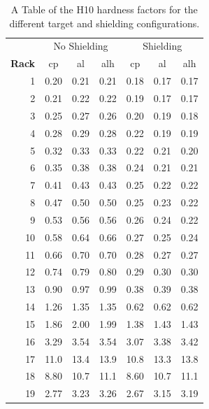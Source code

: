 \documentclass[main.tex]{subfiles}
\begin{document}
\begin{table}[htbp]
  \centering
    \begin{tabular}{r|c|c|c|c|c|c}
     & \multicolumn{3}{c|}{No Shielding} & \multicolumn{3}{c}{Shielding} \\ \cline{2-7}
    \textbf{Rack}  & cp    & al    & alh   & cp    & al    & alh \\ 
    \hline \hline
    1     & 0.20  & 0.21  & 0.21  & 0.18  & 0.17  & 0.17 \\
    2     & 0.21  & 0.22  & 0.22  & 0.19  & 0.17  & 0.17 \\
    3     & 0.25  & 0.27  & 0.26  & 0.20  & 0.19  & 0.18 \\
    4     & 0.28  & 0.29  & 0.28  & 0.22  & 0.19  & 0.19 \\
    5     & 0.32  & 0.33  & 0.33  & 0.22  & 0.21  & 0.20 \\
    6     & 0.35  & 0.38  & 0.38  & 0.24  & 0.21  & 0.21 \\
    7     & 0.41  & 0.43  & 0.43  & 0.25  & 0.22  & 0.22 \\
    8     & 0.47  & 0.50  & 0.50  & 0.25  & 0.23  & 0.22 \\
    9     & 0.53  & 0.56  & 0.56  & 0.26  & 0.24  & 0.22 \\
    10    & 0.58  & 0.64  & 0.66  & 0.27  & 0.25  & 0.24 \\
    11    & 0.66  & 0.70  & 0.70  & 0.28  & 0.27  & 0.27 \\
    12    & 0.74  & 0.79  & 0.80  & 0.29  & 0.30  & 0.30 \\
    13    & 0.90  & 0.97  & 0.99  & 0.38  & 0.39  & 0.38 \\
    14    & 1.26  & 1.35  & 1.35  & 0.62  & 0.62  & 0.62 \\
    15    & 1.86  & 2.00  & 1.99  & 1.38  & 1.43  & 1.43 \\
    16    & 3.29  & 3.54  & 3.54  & 3.07  & 3.38  & 3.42 \\
    17    & 11.0  & 13.4  & 13.9  & 10.8  & 13.3  & 13.8 \\
    18    & 8.80  & 10.7  & 11.1  & 8.60  & 10.7  & 11.1 \\
    19    & 2.77  & 3.23  & 3.26  & 2.67  & 3.15  & 3.19 \\
    \end{tabular}%
    \caption{A Table of the H10 hardness factors for the different target and shielding configurations.}
  \label{tab:addlabel}%
\end{table}%
\end{document}
